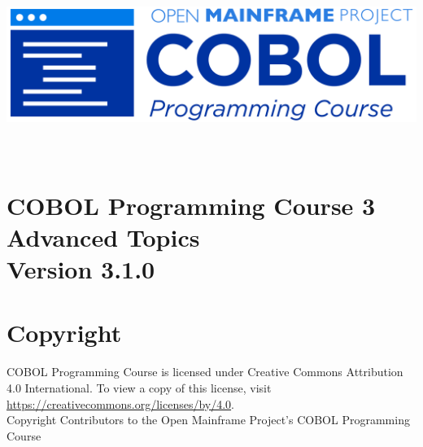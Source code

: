 \begin{center}
  \vspace*{25pt}
\includegraphics{Images/COBOL-Programming-Course.png}
\hypertarget{cobol-programming-course-3}{%
\section*{
  \\[35pt]
  \Huge COBOL Programming Course 3 \\[10pt]
  \Huge Advanced Topics \\[15pt]
  \Large Version 3.1.0}\label{cobol-programming-course-3}}
\end{center}

\pagebreak
\hypertarget{copyright}{%
\section*{Copyright}{
  \normalsize COBOL Programming Course is licensed under Creative Commons 
  Attribution 4.0 International. To view a copy of this license, visit 
  \href{https://creativecommons.org/licenses/by/4.0}{https://creativecommons.org/licenses/by/4.0}. \\[10pt]
  Copyright Contributors to the Open Mainframe Project's COBOL Programming Course}\label{copyright}}
\pagebreak